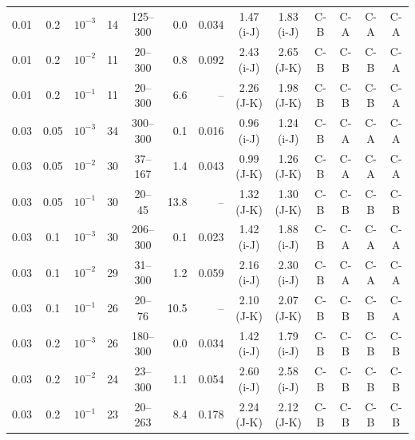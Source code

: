 \begin{tabular}{cccrcrrcccccc}
0.01 & 0.2 & $10^{-3}$ & 14 & 125--300 & 0.0 & 0.034 & 1.47 (i-J) & 1.83 (i-J) & C-B & C-A & C-A & C-A \\
0.01 & 0.2 & $10^{-2}$ & 11 & 20--300 & 0.8 & 0.092 & 2.43 (i-J) & 2.65 (J-K) & C-B & C-B & C-B & C-A \\
0.01 & 0.2 & $10^{-1}$ & 11 & 20--300 & 6.6 & -- & 2.26 (J-K) & 1.98 (J-K) & C-B & C-B & C-B & C-A \\
0.03 & 0.05 & $10^{-3}$ & 34 & 300--300 & 0.1 & 0.016 & 0.96 (i-J) & 1.24 (i-J) & C-B & C-A & C-A & C-A \\
0.03 & 0.05 & $10^{-2}$ & 30 & 37--167 & 1.4 & 0.043 & 0.99 (J-K) & 1.26 (J-K) & C-B & C-A & C-A & C-A \\
0.03 & 0.05 & $10^{-1}$ & 30 & 20--45 & 13.8 & -- & 1.32 (J-K) & 1.30 (J-K) & C-B & C-B & C-B & C-B \\
0.03 & 0.1 & $10^{-3}$ & 30 & 206--300 & 0.1 & 0.023 & 1.42 (i-J) & 1.88 (i-J) & C-B & C-A & C-A & C-A \\
0.03 & 0.1 & $10^{-2}$ & 29 & 31--300 & 1.2 & 0.059 & 2.16 (i-J) & 2.30 (i-J) & C-B & C-A & C-A & C-A \\
0.03 & 0.1 & $10^{-1}$ & 26 & 20--76 & 10.5 & -- & 2.10 (J-K) & 2.07 (J-K) & C-B & C-B & C-B & C-A \\
0.03 & 0.2 & $10^{-3}$ & 26 & 180--300 & 0.0 & 0.034 & 1.42 (i-J) & 1.79 (i-J) & C-B & C-B & C-B & C-B \\
0.03 & 0.2 & $10^{-2}$ & 24 & 23--300 & 1.1 & 0.054 & 2.60 (i-J) & 2.58 (i-J) & C-B & C-B & C-B & C-B \\
0.03 & 0.2 & $10^{-1}$ & 23 & 20--263 & 8.4 & 0.178 & 2.24 (J-K) & 2.12 (J-K) & C-B & C-B & C-B & C-B \\
\bottomrule
\end{tabular}
